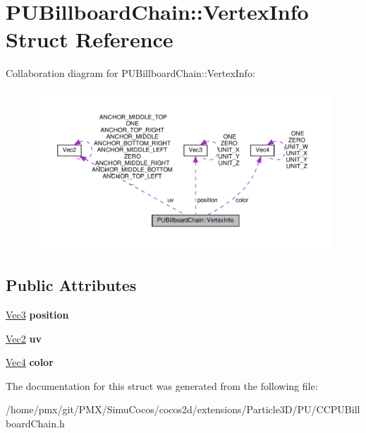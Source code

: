 \hypertarget{structPUBillboardChain_1_1VertexInfo}{}\section{P\+U\+Billboard\+Chain\+:\+:Vertex\+Info Struct Reference}
\label{structPUBillboardChain_1_1VertexInfo}


Collaboration diagram for P\+U\+Billboard\+Chain\+:\+:Vertex\+Info\+:
\nopagebreak
\begin{figure}[H]
\begin{center}
\leavevmode
\includegraphics[width=350pt]{structPUBillboardChain_1_1VertexInfo__coll__graph}
\end{center}
\end{figure}
\subsection*{Public Attributes}
\begin{DoxyCompactItemize}
\item 
\mbox{\label{structPUBillboardChain_1_1VertexInfo_a9346dfc240494693905b26a46dc16357}} 
\hyperlink{classVec3}{Vec3} {\bfseries position}
\item 
\mbox{\label{structPUBillboardChain_1_1VertexInfo_a12d39389d2c72cea9756446651b51456}} 
\hyperlink{classVec2}{Vec2} {\bfseries uv}
\item 
\mbox{\label{structPUBillboardChain_1_1VertexInfo_a427cd57a3d5c2ebbabe14bf681c7f4e1}} 
\hyperlink{classVec4}{Vec4} {\bfseries color}
\end{DoxyCompactItemize}


The documentation for this struct was generated from the following file\+:\begin{DoxyCompactItemize}
\item 
/home/pmx/git/\+P\+M\+X/\+Simu\+Cocos/cocos2d/extensions/\+Particle3\+D/\+P\+U/C\+C\+P\+U\+Billboard\+Chain.\+h\end{DoxyCompactItemize}
